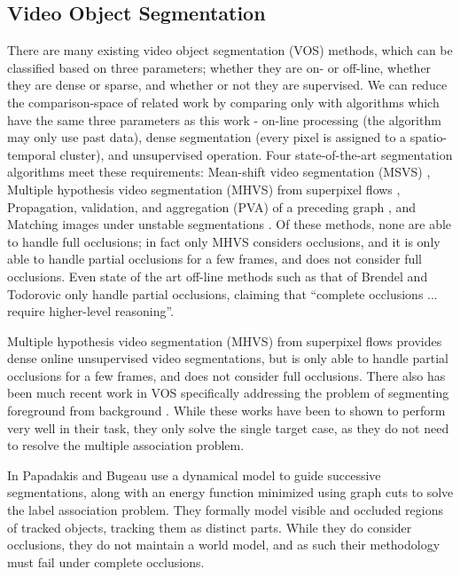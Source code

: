 \subsection{Video Object Segmentation}
There are many existing video object segmentation (VOS) methods, which can be classified based on three parameters; whether they are on- or off-line, whether they are dense or sparse, and whether or not they are supervised. We can reduce the comparison-space of related work by comparing only with algorithms which have the same three parameters as this work - on-line processing (the algorithm may only use past data), dense segmentation (every pixel is assigned to a spatio-temporal cluster), and unsupervised operation. Four state-of-the-art segmentation algorithms meet these requirements: Mean-shift video segmentation (MSVS) \cite{MSVS}, Multiple hypothesis video segmentation (MHVS) from superpixel flows \cite{MHVS}, Propagation, validation, and aggregation (PVA) of a preceding graph \cite{PropValAgg}, and Matching images under unstable segmentations \cite{MatchingUnstable}.  Of these methods, none are able to handle full occlusions; in fact only MHVS considers occlusions, and it is only able to handle partial 
occlusions for a few frames, and does not consider full occlusions. Even state of the art off-line methods such as that of Brendel and Todorovic \cite{SegTrackRegions} only handle partial occlusions, claiming that ``complete occlusions ... require higher-level reasoning''.  

Multiple hypothesis video segmentation (MHVS) from superpixel flows \cite{MHVS} provides dense online unsupervised video segmentations, but is only able to handle partial occlusions for a few frames, and does not consider full occlusions. There also has been much recent work in VOS specifically addressing the problem of segmenting foreground from background \cite{MWCwMC,GC_SURF}. While these works have been to shown to perform very well in their task, they only solve the single target case, as they do not need to resolve the multiple association problem.

In \cite{TrackingOcclusionsGraphCuts} Papadakis and Bugeau use a dynamical model to guide successive segmentations, along with an energy function minimized using graph cuts to solve the label association problem. They formally model visible and occluded regions of tracked objects, tracking them as distinct parts. While they do consider occlusions, they do not maintain a world model, and as such their methodology must fail under complete occlusions.

